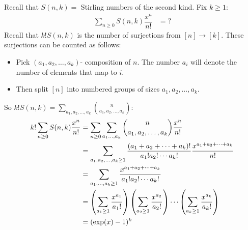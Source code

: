 \documentclass{report}
\begin{document}
\begin{examples}
    \begin{example}
        Recall that $S(n, k) = $ Stirling numbers of the second kind. Fix $k \geq 1$:
            \begin{align*}
                \sum_{n \geq 0}S(n, k)\dfrac{x^{n}}{n!} &= ?   
            \end{align*}
        Recall that $k!S(n, k)$ is the number of surjections from $[n] \rightarrow [k]$. These surjections can be counted as follows:
            \begin{itemize}
                \item Pick $(a_{1}, a_{2}, \ldots , a_{k})$- composition of $n$. The number $a_{i}$ will denote the number of elements that map to $i$. 

                \item Then split $[n]$ into numbered groups of sizes $a_{1}, a_{2}, \ldots , a_{k}$. 
            \end{itemize}
        So $k!S(n, k) = \sum_{a_{1}, a_{2}, \ldots , a_{k}}\binom{n}{a_{1},a_{2},\ldots, a_{k}}$:
            \begin{align*}
                k!\sum_{n \geq 0}S(n, k)\dfrac{x^{n}}{n!} &= \sum_{n \geq 0}\sum_{a_{1} \ldots , a_{k}}\dbinom{n}{a_{1}, a_{2}, \ldots , a_{k}}\dfrac{x^{n}}{n!}                                                                                 \\
                                                          &= \sum_{a_{1}, a_{2}, \ldots, a_{k} \geq 1} \dfrac{(a_{1} + a_{2} + \cdots + a_{k})!}{a_{1}!a_{2}! \cdots a_{k}!}\dfrac{x^{a_{1} + a_{2} + \cdots  + a_{k}}}{n!}                      \\
                                                          &= \sum_{a_{1}, \ldots , a_{k} \geq 1} \dfrac{x^{a_{1} + a_{2} + \cdots  + a_{k}}}{a_{1}!a_{2}! \cdots a_{k}!}                                                                         \\
                                                          &= \left(\sum_{a_{1} \geq 1}\dfrac{x^{a_{1}}}{a_{1}!}\right)\left(\sum_{a_{2} \geq 1}\dfrac{x^{a_{2}}}{a_{2}!}\right) \cdots \left(\sum_{a_{k} \geq 1}\dfrac{x^{a_{k}}}{a_{k}!}\right) \\
                                                          &= (\exp(x) - 1)^{k}                                                                                                                                                                     
            \end{align*}

\end{example}
\end{examples}
\end{document}
